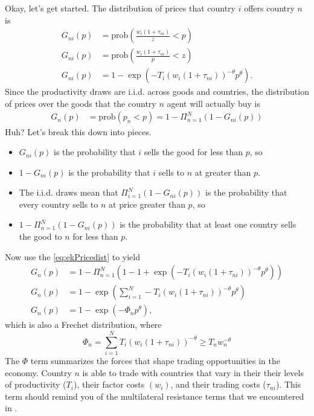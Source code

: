\documentclass[11pt, pdftex]{article}
\begin{document}
Okay, let's get started. The distribution of prices that country $i$ offers country $n$ is
\begin{align}
    G_{ni}(p)&=\mathrm{prob}\left(\frac{w_i\left(1+\tau_{ni} \right)}{z}<p\right)\\
    G_{ni}(p)&=\mathrm{prob}\left(\frac{w_i\left(1+\tau_{ni} \right)}{p}<z\right)\\
    G_{ni}(p)&=1-\exp\left(-T_i \left(w_i\left(1+\tau_{ni} \right) \right)^{-\theta} p^{\theta}\right) \label{eq:ekPricedist}.
\end{align}
Since the productivity draws are i.i.d. across goods and countries, the distribution of prices over the goods that the country $n$ agent will actually buy is
\begin{align}
    G_{n}(p)&=\mathrm{prob}\left(p_{n} < p \right) = 1-\Pi_{n=1}^N\left(1-G_{ni}(p) \right)
\end{align}
Huh?  Let's break this down into pieces.
\begin{itemize}
\item $G_{ni}\left(p \right)$ is the probability that $i$ sells the good for less than $p$, so
\item $1-G_{ni}\left(p \right)$ is the probability that $i$ sells to $n$ at greater than $p$.
\item The i.i.d. draws mean that $\Pi_{i=1}^N\left(1-G_{ni}(p) \right)$ is the probability that every country sells to $n$ at price greater than $p$, so
 \item $1-\Pi_{n=1}^N\left(1-G_{ni}(p) \right)$ is the probability that at least one country sells the good to $n$ for less than $p$.
\end{itemize}
Now use the \eqref{eq:ekPricedist} to yield
\begin{align}
    G_{n}(p)&= 1-\Pi_{n=1}^N\left(1-1+\exp\left(-T_i \left(w_i\left(1+\tau_{ni} \right) \right)^{-\theta} p^{\theta}\right) \right)\\
    G_{n}(p)&= 1-\exp\left(\sum_{i=1}^N-T_i \left(w_i\left(1+\tau_{ni} \right) \right)^{-\theta} p^{\theta}\right)\\
    G_{n}(p)&= 1-\exp\left(-\Phi_n p^{\theta}\right),
\end{align}
which is also a Frechet distribution, where
\begin{equation}\label{eq:Phi}
    \Phi_n=\sum_{i=1}^NT_i \left( w_i\left(1+\tau_{ni}\right) \right)^{-\theta} \geq T_nw_n^{-\theta}
\end{equation}
The $\Phi$ term summarizes the forces that shape trading opportunities in the economy. Country $n$ is able to trade with countries that vary in their their levels of productivity ($T_i$), their factor costs $(w_i)$, and their trading costs ($\tau_{ni}$). This term should remind you of the multilateral resistance terms that we encountered in \citet{andersonVanwin}.
\end{document}
